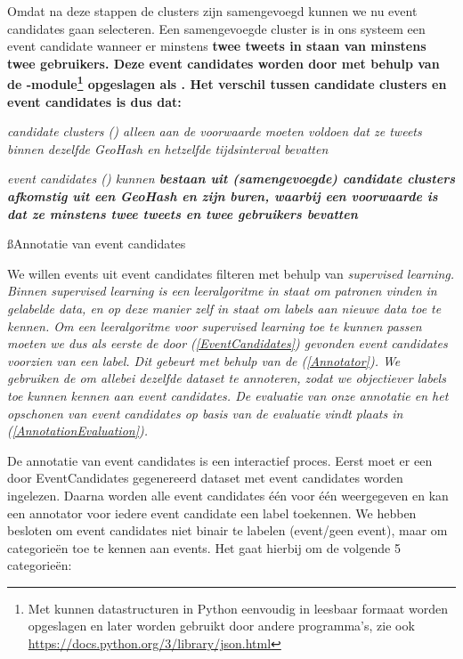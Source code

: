 {{Omdat na deze stappen de clusters zijn samengevoegd kunnen we nu event 
candidates gaan selecteren. Een samengevoegde cluster is in ons systeem een 
event candidate wanneer er minstens \bf{twee tweets} in staan van minstens \bf{twee 
gebruikers}. Deze event candidates worden door  met behulp van de 
-module\footnote{Met  kunnen datastructuren in Python eenvoudig 
in leesbaar formaat worden opgeslagen en later worden gebruikt door andere
programma's, zie ook \url{https://docs.python.org/3/library/json.html}} opgeslagen
als .
\vl
Het verschil tussen candidate clusters en event candidates is dus dat:

\begin{bullets}
\item \it{candidate clusters} () alleen aan de voorwaarde moeten voldoen 
dat ze tweets binnen dezelfde GeoHash en hetzelfde tijdsinterval bevatten
\item \it{event candidates} () kunnen \bf{bestaan} uit (samengevoegde) candidate 
clusters afkomstig uit een GeoHash \bf{en} zijn buren, waarbij een voorwaarde is dat 
ze minstens twee tweets en twee gebruikers bevatten
\end{bullets}

\ss{Annotatie van event candidates}\label{annotatie}

We willen events uit event candidates filteren met behulp van \it{supervised 
learning}. Binnen supervised learning is een leeralgoritme in staat om patronen 
vinden in gelabelde data, en op deze manier zelf in staat om labels aan nieuwe 
data toe te kennen. Om een leeralgoritme voor supervised learning toe te kunnen 
passen moeten we dus als eerste de door  (\ref{EventCandidates}) gevonden event 
candidates voorzien van een label. Dit gebeurt met behulp van de 
(\ref{Annotator}). We gebruiken de  om allebei dezelfde dataset te annoteren, 
zodat we objectiever labels toe kunnen kennen aan event candidates. De evaluatie 
van onze annotatie en het opschonen van event candidates op basis van de 
evaluatie vindt plaats in  (\ref{AnnotationEvaluation}).

\label{Annotator}

De annotatie van event candidates is een interactief proces. Eerst moet er een 
door EventCandidates gegenereerd dataset met event candidates worden ingelezen. 
Daarna worden alle event candidates één voor één weergegeven en kan een 
annotator voor iedere event candidate een label toekennen. We hebben besloten om 
event candidates niet binair te labelen (event/geen event), maar om categorieën 
toe te kennen aan events. Het gaat hierbij om de volgende 5 categorieën:

}}
